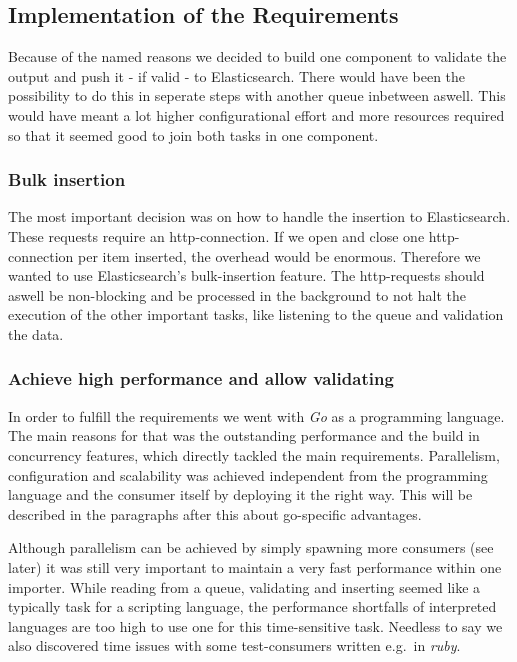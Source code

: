 \subsection{Implementation of the
Requirements}\label{implementation-of-the-requirements}

Because of the named reasons we decided to build one component to
validate the output and push it - if valid - to Elasticsearch. There
would have been the possibility to do this in seperate steps with
another queue inbetween aswell. This would have meant a lot higher
configurational effort and more resources required so that it seemed
good to join both tasks in one component.

\subsubsection{Bulk insertion}\label{bulk-insertion}

The most important decision was on how to handle the insertion to
Elasticsearch. These requests require an http-connection. If we open and
close one http-connection per item inserted, the overhead would be
enormous. Therefore we wanted to use Elasticsearch's bulk-insertion
feature. The http-requests should aswell be non-blocking and be
processed in the background to not halt the execution of the other
important tasks, like listening to the queue and validation the data.

\subsubsection{Achieve high performance and allow
validating}\label{achieve-high-performance-and-allow-validating}

In order to fulfill the requirements we went with \emph{Go} as a
programming language. The main reasons for that was the outstanding
performance and the build in concurrency features, which directly
tackled the main requirements. Parallelism, configuration and
scalability was achieved independent from the programming language and
the consumer itself by deploying it the right way. This will be
described in the paragraphs after this about go-specific advantages.

Although parallelism can be achieved by simply spawning more consumers
(see later) it was still very important to maintain a very fast
performance within one importer. While reading from a queue, validating
and inserting seemed like a typically task for a scripting language, the
performance shortfalls of interpreted languages are too high to use one
for this time-sensitive task. Needless to say we also discovered time
issues with some test-consumers written e.g.~in \emph{ruby}.

